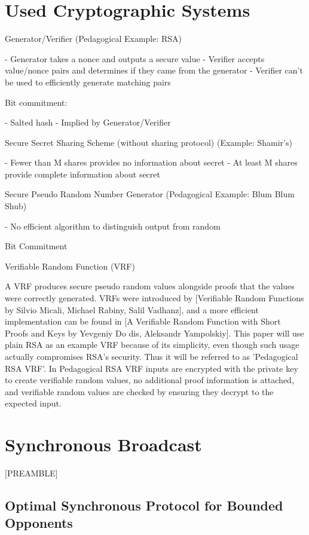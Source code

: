 \documentclass{dalcsthesis}
\begin{document}
\chapter{Used Cryptographic Systems}

Generator/Verifier (Pedagogical Example: RSA)

- Generator takes a nonce and outputs a secure value
- Verifier accepts value/nonce pairs and determines if they came from the generator
- Verifier can't be used to efficiently generate matching pairs

Bit commitment:

- Salted hash
- Implied by Generator/Verifier

Secure Secret Sharing Scheme (without sharing protocol) (Example: Shamir's)

- Fewer than M shares provides no information about secret
- At least M shares provide complete information about secret

Secure Pseudo Random Number Generator (Pedagogical Example: Blum Blum Shub)

- No efficient algorithm to distinguish output from random

Bit Commitment

Verifiable Random Function (VRF)

A VRF produces secure pseudo random values alongside proofs that the values were correctly generated. VRFs were introduced by [Verifiable Random Functions by Silvio Micali, Michael Rabiny, Salil Vadhanz], and a more efficient implementation can be found in [A Verifiable Random Function with Short Proofs and Keys by Yevgeniy Do dis, Aleksandr Yampolskiy]. This paper will use plain RSA as an example VRF because of its simplicity, even though such usage actually compromises RSA's security. Thus it will be referred to as 'Pedagogical RSA VRF'. In Pedagogical RSA VRF inputs are encrypted with the private key to create verifiable random values, no additional proof information is attached, and verifiable random values are checked by ensuring they decrypt to the expected input.  

\chapter{Synchronous Broadcast}

[PREAMBLE]

\section{Optimal Synchronous Protocol for Bounded Opponents}
\end{document}
